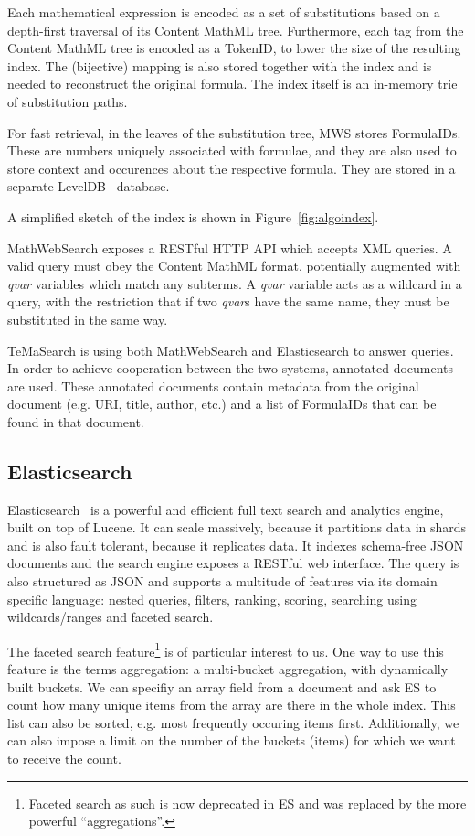 \documentclass[a4paper,11pt,oneside]{article}
\def\MWS{\textsf{MWS}\xspace}
\def\mws{\textsf{MathWebSearch}\xspace}
\def\tms{\textsf{TeMaSearch}\xspace}
\def\els{\textsf{Elasticsearch}\xspace}
\def\cmml{\textsf{Content MathML}\xspace}
\def\xml{\textsf{XML}\xspace}
\begin{document}
Each mathematical expression is encoded as a set of substitutions based
on a depth-first traversal of its \cmml tree.
Furthermore, each tag from the \cmml tree is encoded as a \textsf{TokenID},
to lower the size of the resulting index. The (bijective) mapping is also
stored together with the index and is needed to reconstruct the original
formula. The index itself is an in-memory trie of substitution paths.

For fast retrieval, in the leaves of the substitution tree, \MWS stores
\textsf{FormulaID}s. These are numbers uniquely associated with formulae,
and they are also used to store context and occurences about the respective
formula. They are stored in a separate LevelDB~\cite{leveldb:online} database.

A simplified sketch of the index is shown in Figure~\ref{fig:algoindex}.

\mws exposes a RESTful HTTP API which accepts \xml queries.
A valid query must obey the \cmml format, potentially augmented with
\emph{qvar} variables which match any subterms.  A \emph{qvar} variable acts as
a wildcard in a query, with the restriction that if two \emph{qvar}s have the
same name, they must be substituted in the same way.

\tms is using both \mws and \els to answer queries.
In order to achieve cooperation between the two systems, annotated documents
are used. These annotated documents contain metadata from the original document
(e.g. URI, title, author, etc.) and a list of \textsf{FormulaID}s that can be
found in that document.

\subsection{Elasticsearch}\label{subsec:prelim:els}
Elasticsearch~\cite{esl:online} is a powerful and efficient full text search
and analytics engine, built on top of Lucene. It can scale massively, because
it partitions data in shards and is also fault tolerant, because it replicates
data.  It indexes schema-free JSON documents and the search engine exposes a
RESTful web interface.  The query is also structured as JSON and supports a
multitude of features via its domain specific language:  nested queries,
filters, ranking, scoring, searching using wildcards/ranges and faceted search. 

The faceted search feature\footnote{Faceted search as such is now deprecated in
ES and was replaced by the more powerful ``aggregations''.} is of particular
interest to us.
One way to use this feature is the terms aggregation: a multi-bucket
aggregation, with dynamically built buckets.
We can specifiy an array field from a document and ask ES to count how many
unique items from the array are there in the whole index.
This list can also be sorted, e.g. most frequently occuring items first.
Additionally, we can also impose a limit on the number of the buckets (items)
for which we want to receive the count.
\end{document}
